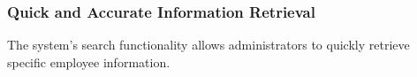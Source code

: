 \documentclass[12pt]{report}
\begin{document}
\subsubsection{Quick and Accurate Information Retrieval}
The system’s search functionality allows administrators to quickly retrieve specific 
employee information.

\end{document}
